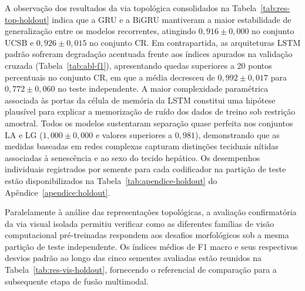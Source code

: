 A observação dos resultados da via topológica consolidados na Tabela~\ref{tab:res-top-holdout} indica que a GRU e a BiGRU mantiveram a maior estabilidade de generalização entre os modelos recorrentes, atingindo $0{,}916 \pm 0{,}000$ no conjunto UCSB e $0{,}926 \pm 0{,}015$ no conjunto CR. Em contrapartida, as arquiteturas LSTM padrão sofreram degradação acentuada frente aos índices apurados na validação cruzada (Tabela~\ref{tab:abl-f1}), apresentando quedas superiores a 20 pontos percentuais no conjunto CR, em que a média decresceu de $0{,}992 \pm 0{,}017$ para $0{,}772 \pm 0{,}060$ no teste independente. A maior complexidade paramétrica associada às portas da célula de memória da LSTM constitui uma hipótese plausível para explicar a memorização de ruído dos dados de treino sob restrição amostral. Todos os modelos sustentaram separação quase perfeita nos conjuntos LA e LG ($1{,}000 \pm 0{,}000$ e valores superiores a $0{,}981$), demonstrando que as medidas baseadas em redes complexas capturam distinções teciduais nítidas associadas à senescência e ao sexo do tecido hepático. Os desempenhos individuais registrados por semente para cada codificador na partição de teste estão disponibilizados na Tabela~\ref{tab:apendice-holdout} do Apêndice~\ref{apendice:holdout}.

Paralelamente à análise das representações topológicas, a avaliação confirmatória da via visual isolada permitiu verificar como as diferentes famílias de visão computacional pré-treinadas respondem aos desafios morfológicos sob a mesma partição de teste independente. Os índices médios de F1 macro e seus respectivos desvios padrão ao longo das cinco sementes avaliadas estão reunidos na Tabela~\ref{tab:res-vis-holdout}, fornecendo o referencial de comparação para a subsequente etapa de fusão multimodal.

